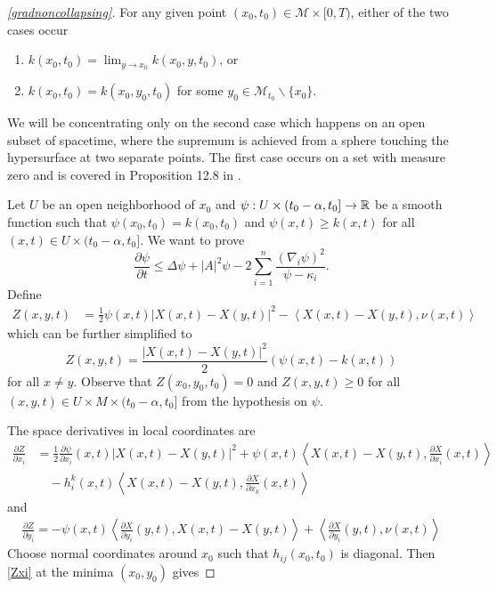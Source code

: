 \begin{proof}[\cref{gradnoncollapsing}]
    For any given point $ (x_{0},t_{0}) \in \mathcal{M} \times [0,T) $, either of the two cases occur
    \begin{enumerate}
        \item $ k(x_{0},t_{0}) = \lim_{y \to x_{0}} k(x_{0},y,t_{0}) $, or 
        \item $ k(x_{0},t_{0}) = k(x_{0}, y_{0},t_{0}) $ for some $ y_{0} \in \mathcal{M}_{t_{0}} \backslash \{x_{0}\} $.
    \end{enumerate}

    We will be concentrating only on the second case which happens on an open subset of spacetime, where the supremum is achieved from a sphere touching the hypersurface at two separate points. The first case occurs on a set with measure zero and is covered in Proposition 12.8 in \cite{andrews2022extrinsic}.
    
    Let $ U $ be an open neighborhood of $ x_{0} $ and $ \psi : U \times (t_{0}-\alpha,t_{0}] \to \mathbb{R} $ be a smooth function such that $ \psi(x_{0},t_{0}) = k(x_{0},t_{0}) $ and $ \psi(x,t) \ge k(x,t) $ for all $ (x,t) \in U \times (t_{0}-\alpha,t_{0}] $. We want to prove\begin{equation}
        \frac{\partial \psi}{\partial t} \le \Delta \psi + |A|^{2}\psi - 2 \sum_{i=1}^{n} \frac{ (\nabla_{i}\psi)^{2}}{\psi-\kappa_{i}}. \label{psi}
    \end{equation}
    Define \begin{align}
        Z(x,y,t) & = \frac{1}{2}\psi(x,t)|X(x,t)-X(y,t)|^{2} - \left< X(x,t) - X(y,t), \nu(x,t) \right>
    \end{align}
    which can be further simplified to \begin{equation*}
        Z(x,y,t) = \frac{|X(x,t)-X(y,t)|^{2}}{2}(\psi(x,t) - k(x,t)) %
    \end{equation*}
    for all $ x \neq y $. Observe that $ Z(x_{0},y_{0},t_{0}) = 0 $  and $ Z(x,y,t) \ge 0 $ for all $ (x,y,t) \in U \times M \times (t_{0}-\alpha,t_{0}] $ from the hypothesis on $ \psi $. 

    The space derivatives in local coordinates are 
    \begin{align}
        \frac{\partial Z}{ \partial x_{i}}  & =  \frac{1}{2} \frac{\partial \psi}{\partial x_{i}}(x,t)|X(x,t) - X(y,t)|^{2} + \psi(x,t)\left< X(x,t)-X(y,t), \frac{\partial X}{\partial x_{i}}(x,t) \right> \nonumber \\
        & \quad - h_{i}^{k}(x,t)\left< X(x,t)-X(y,t), \frac{\partial X}{\partial x_{k}}(x,t) \right> \label{Zxi}
    \end{align}
    and \begin{align}
        \frac{\partial Z}{\partial y_{i}} = - \psi(x,t)\left< \frac{\partial X}{\partial y_{i}}(y,t), X(x,t) - X(y,t) \right> + \left< \frac{\partial X}{\partial y_{i}}(y,t) , \nu(x,t)\right> \label{Zyi}
    \end{align}
    Choose normal coordinates around $ x_{0} $ such that $ h_{ij}(x_{0},t_{0}) $ is diagonal. Then \cref{Zxi} at the minima $ (x_{0},y_{0}) $ gives
    

\end{proof}
